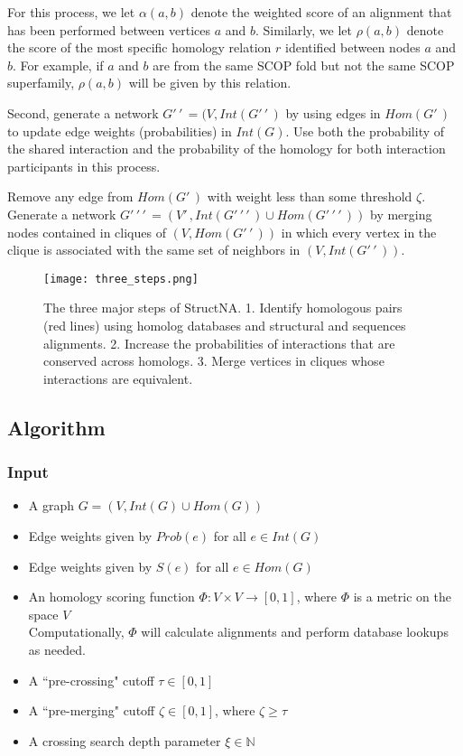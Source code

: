 \documentclass[12pt,twoside]{article}
\begin{document}
For this process, we let $\alpha(a,b)$ denote the weighted score of an alignment that has been performed between vertices $a$ and $b$. Similarly, we let $\rho(a,b)$ denote the score of the most specific homology relation $r$ identified between nodes $a$ and $b$. For example, if $a$ and $b$ are from the same SCOP fold but not the same SCOP superfamily, $\rho(a,b)$ will be given by this relation.

Second, generate a network $G'\,\!'\,\! = (V, Int(G'\,\!'\,\!)$ by using edges in $Hom(G'\,\!)$ to update edge weights (probabilities) in $Int(G)$. Use both the probability of the shared interaction and the probability of the homology for both interaction participants in this process.

Remove any edge from $Hom(G'\,\!)$ with weight less than some threshold $\zeta$. Generate a network $G'\,\!'\,\!'\,\! = (V'\,\!, Int(G'\,\!'\,\!'\,\!) \cup Hom(G'\,\!'\,\!'\,\!))$ by merging nodes contained in cliques of $(V,Hom(G'\,\!'\,\!))$ in which every vertex in the clique is associated with the same set of neighbors  in $(V, Int(G'\,\!'\,\!))$.

\begin{figure}
\texttt{[image: three\_steps.png]}
\caption{The three major steps of StructNA. 1. Identify homologous pairs (red lines) using homolog databases and structural and sequences alignments. 2. Increase the probabilities of interactions that are conserved across homologs. 3. Merge vertices in cliques whose interactions are equivalent.}
\end{figure}

\subsection{Algorithm}

\subsubsection{Input}
\vspace{-1em} \begin{itemize}\itemsep 0em
\item A graph $G=(V,Int(G) \cup Hom(G))$
\item Edge weights given by $Prob(e)$ for all $e \in Int(G)$
\item Edge weights given by $S(e)$ for all $e \in Hom(G)$
\item An homology scoring function $\Phi : V \times V \rightarrow [0,1]$, where $\Phi$ is a metric on the space $V$\\
Computationally, $\Phi$ will calculate alignments and perform database lookups as needed.
\item A ``pre-crossing" cutoff $\tau \in [0,1]$
\item A ``pre-merging" cutoff $\zeta \in [0,1]$, where $\zeta \geq \tau$
\item A crossing search depth parameter $\xi \in \mathbb{N}$
\end{itemize}
\end{document}
